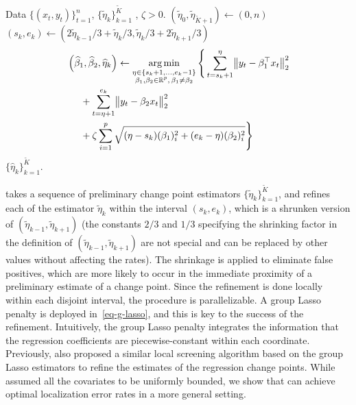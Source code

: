 \documentclass[twoside]{article}
\DeclareMathOperator*{\argmin}{arg\,min}
\begin{document}
\begin{algorithm}[htbp]
\begin{algorithmic}
	\INPUT Data $\{(x_t, y_t)\}_{t=1}^{n}$, $\{\widetilde{\eta}_k\}_{k = 1}^{\widetilde{K}}$ ,  $\zeta > 0$.
	\State $(\widetilde{\eta}_0, \widetilde{\eta}_{\widetilde{K} + 1}) \leftarrow (0, n)$
		\State $(s_k, e_k) \leftarrow (2\widetilde{\eta}_{k-1}/3 + \widetilde{\eta}_{k}/3, \widetilde{\eta}_{k}/3 + 2\widetilde{\eta}_{k+1}/3)$
		\State 
		\begin{align}
			& \left(\widehat{\beta}_1, \widehat{\beta}_2, \widehat{\eta}_k\right) \leftarrow \argmin_{\substack{\eta \in \{s_k + 1, \ldots, e_k - 1\} \\ \beta_1, \beta_2 \in \mathbb{R}^{p},\, \beta_1 \neq \beta_2}}   \Bigg\{\sum_{t = s_k + 1}^{\eta}\bigl\|y_{t} - \beta_1^{\top} x_t\bigr\|^2_2 \nonumber \\
			& \hspace{0.5cm}+ \sum_{t = \eta + 1}^{e_k}\bigl\|y_t - \beta_2 x_t\bigr\|_2^2 \nonumber \\
		    & \hspace{0.5cm} + \zeta  \sum_{i = 1}^p \sqrt{(\eta - s_k)(\beta_1)_{i}^2 + (e_k - \eta)(\beta_2)_{i}^2}\Bigg\} \label{eq-g-lasso}
		\end{align}
	\EndFor
	\OUTPUT $\{\widehat{\eta}_k\}_{k = 1}^{\widetilde{K}}$.
\caption{Local Refinement. }%
\label{algorithm:LR}
\end{algorithmic}
\end{algorithm} 
	
 takes a sequence of preliminary change point estimators $\{\widetilde{\eta}_k\}_{k = 1}^{\widetilde{K}}$, and refines each of the estimator $\widetilde{\eta}_k$ within the interval $(s_k, e_k)$, which is a shrunken version of $(\widetilde{\eta}_{k-1}, \widetilde{\eta}_{k+1})$ (the constants $2/3$ and $1/3$ specifying the shrinking factor in the definition of $(\widetilde{\eta}_{k-1}, \widetilde{\eta}_{k+1})$ are not special and can be replaced by other values without affecting the rates).  The shrinkage is applied to eliminate false positives, which are more likely to occur in the immediate proximity of a preliminary estimate of a change point.  Since the refinement is done locally within each disjoint interval, the procedure is parallelizable.  A group Lasso penalty is deployed in~\eqref{eq-g-lasso}, and this is key to the success of the refinement.  Intuitively, the group Lasso penalty integrates the information that the regression coefficients are piecewise-constant within each coordinate.  Previously, \cite{wang2019statistically} also proposed a similar  local screening algorithm based on the group Lasso estimators to refine the estimates of the  regression change points.   While  \cite{wang2019statistically} assumed all the covariates to be uniformly bounded,  we show that  can achieve optimal localization error rates  in a more general setting.%
\end{document}
